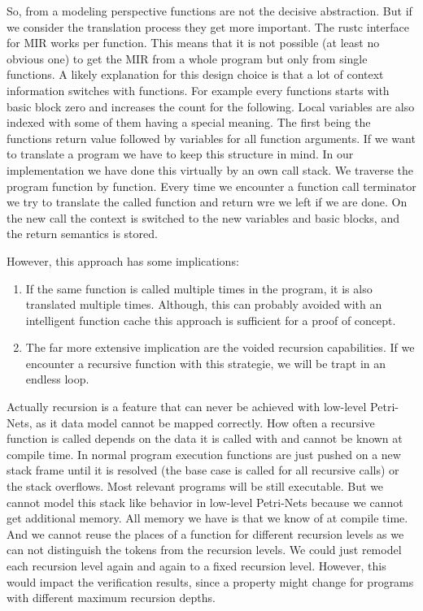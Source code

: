 So, from a modeling perspective functions are not the decisive abstraction.
But if we consider the translation process they get more important.
The rustc interface for MIR works per function.
This means that it is not possible (at least no obvious one) to get the MIR from a whole program but only from single functions.
A likely explanation for this design choice is that a lot of context information switches with functions.
For example every functions starts with basic block zero and increases the count for the following.
Local variables are also indexed with some of them having a special meaning.
The first being the functions return value followed by variables for all function arguments.
If we want to translate a program we have to keep this structure in mind.
In our implementation we have done this virtually by an own call stack.
We traverse the program function by function.
Every time we encounter a function call terminator we try to translate the called function and return wre we left if we are done.
On the new call the context is switched to the new variables and basic blocks, and the return semantics is stored.

However, this approach has some implications:
\begin{enumerate}
    \item If the same function is called multiple times in the program, it is also translated multiple times.
    Although, this can probably avoided with an intelligent function cache this approach is sufficient for a proof of concept.
    \item The far more extensive implication are the voided recursion capabilities.
    If we encounter a recursive function with this strategie, we will be trapt in an endless loop.
\end{enumerate}
Actually recursion is a feature that can never be achieved with low-level Petri-Nets, as it data model cannot be mapped correctly.
How often a recursive function is called depends on the data it is called with and cannot be known at compile time.
In normal program execution functions are just pushed on a new stack frame until it is resolved (the base case is called for all recursive calls) or the stack overflows.
Most relevant programs will be still executable.
But we cannot model this stack like behavior in low-level Petri-Nets because we cannot get additional memory.
All memory we have is that we know of at compile time.
And we cannot reuse the places of a function for different recursion levels as we can not distinguish the tokens from the recursion levels.
We could just remodel each recursion level again and again to a fixed recursion level.
However, this would impact the verification results, since a property might change for programs with different maximum recursion depths.

